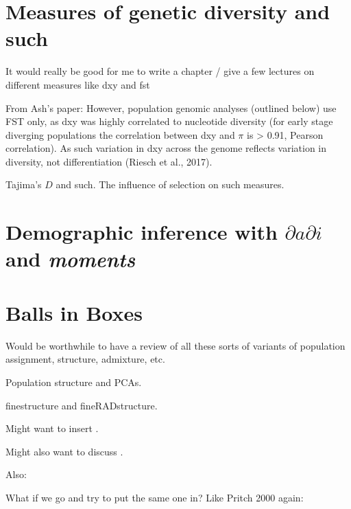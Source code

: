 \documentclass[]{krantz}
\begin{document}
\hypertarget{measures-of-genetic-diversity-and-such}{%
\section{Measures of genetic diversity and such}\label{measures-of-genetic-diversity-and-such}}

It would really be good for me to write a chapter / give a few lectures
on different measures like dxy and fst

From Ash's paper: However, population genomic analyses (outlined below) use FST only, as dxy was highly correlated to nucleotide diversity (for early stage diverging populations the correlation between dxy and \(\pi\) is \textgreater{} 0.91, Pearson correlation). As such variation in dxy across the genome reflects variation in diversity, not differentiation (Riesch et al., 2017).

Tajima's \(D\) and such. The influence of selection on such measures.

\hypertarget{demographic-inference-with-partial-a-partial-i-and-moments}{%
\section{\texorpdfstring{Demographic inference with \(\partial a \partial i\) and \emph{moments}}{Demographic inference with \textbackslash{}partial a \textbackslash{}partial i and moments}}\label{demographic-inference-with-partial-a-partial-i-and-moments}}

\hypertarget{balls-in-boxes}{%
\section{Balls in Boxes}\label{balls-in-boxes}}

Would be worthwhile to have a review of all these sorts of variants of
population assignment, structure, admixture, etc.

Population structure and PCAs.

finestructure and fineRADstructure.

Might want to insert \citet{BradburdInferringContinuousDiscrete2018}.

Might also want to discuss \citet{PickrellInferencePopulationSplits2012}.

Also: \citet{PritchardInferencePopulationStructure2000}

What if we go and try to put the same one in? Like Pritch 2000 again: \citep{PritchardInferencePopulationStructure2000}
\end{document}
